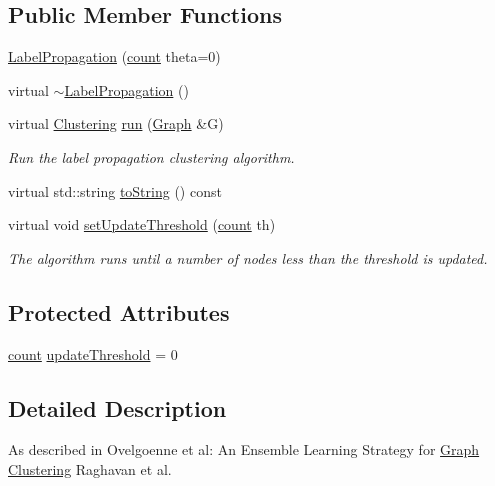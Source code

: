 \subsection*{Public Member Functions}
\begin{DoxyCompactItemize}
\item 
\hyperlink{class_ensemble_clustering_1_1_label_propagation_a72a8f90b8e7632915c729861d320c240}{Label\-Propagation} (\hyperlink{namespace_ensemble_clustering_a2482e94ca22a0c6544a5a9173186fde8}{count} theta=0)
\item 
virtual \hyperlink{class_ensemble_clustering_1_1_label_propagation_a7ac63cb56597fdef47e6c0f4f7b20254}{$\sim$\-Label\-Propagation} ()
\item 
virtual \hyperlink{class_ensemble_clustering_1_1_clustering}{Clustering} \hyperlink{class_ensemble_clustering_1_1_label_propagation_ab6680246bb334e82318703c2ecbbd117}{run} (\hyperlink{class_ensemble_clustering_1_1_graph}{Graph} \&G)
\begin{DoxyCompactList}\small\item\em Run the label propagation clustering algorithm. \end{DoxyCompactList}\item 
virtual std\-::string \hyperlink{class_ensemble_clustering_1_1_label_propagation_a1672735899b9c00e797f0270638fba7f}{to\-String} () const 
\item 
virtual void \hyperlink{class_ensemble_clustering_1_1_label_propagation_adcb4fa1b00aa36461bf3b1c46bc3b892}{set\-Update\-Threshold} (\hyperlink{namespace_ensemble_clustering_a2482e94ca22a0c6544a5a9173186fde8}{count} th)
\begin{DoxyCompactList}\small\item\em The algorithm runs until a number of nodes less than the threshold is updated. \end{DoxyCompactList}\end{DoxyCompactItemize}
\subsection*{Protected Attributes}
\begin{DoxyCompactItemize}
\item 
\hyperlink{namespace_ensemble_clustering_a2482e94ca22a0c6544a5a9173186fde8}{count} \hyperlink{class_ensemble_clustering_1_1_label_propagation_a02e1930c35c9b2fe9121415cb6be7b65}{update\-Threshold} = 0
\end{DoxyCompactItemize}


\subsection{Detailed Description}
As described in Ovelgoenne et al\-: An Ensemble Learning Strategy for \hyperlink{class_ensemble_clustering_1_1_graph}{Graph} \hyperlink{class_ensemble_clustering_1_1_clustering}{Clustering} Raghavan et al. 

